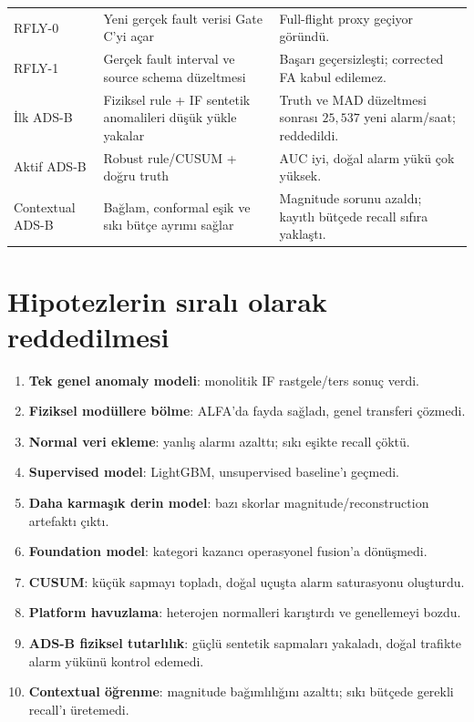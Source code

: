 \documentclass[11pt,a4paper,oneside]{report}
\begin{document}
\begin{longtable}{L{0.12\textwidth}L{0.31\textwidth}L{0.47\textwidth}}
RFLY-0 & Yeni gerçek fault verisi Gate C'yi açar & Full-flight proxy geçiyor göründü.\\
RFLY-1 & Gerçek fault interval ve source schema düzeltmesi & Başarı geçersizleşti; corrected FA kabul edilemez.\\
İlk ADS-B & Fiziksel rule + IF sentetik anomalileri düşük yükle yakalar & Truth ve MAD düzeltmesi sonrası \(25{,}537\) yeni alarm/saat; reddedildi.\\
Aktif ADS-B & Robust rule/CUSUM + doğru truth & AUC iyi, doğal alarm yükü çok yüksek.\\
Contextual ADS-B & Bağlam, conformal eşik ve sıkı bütçe ayrımı sağlar & Magnitude sorunu azaldı; kayıtlı bütçede recall sıfıra yaklaştı.\\
\bottomrule
\end{longtable}

\section{Hipotezlerin sıralı olarak reddedilmesi}

\begin{enumerate}
  \item \textbf{Tek genel anomaly modeli}: monolitik IF rastgele/ters sonuç verdi.
  \item \textbf{Fiziksel modüllere bölme}: ALFA'da fayda sağladı, genel transferi çözmedi.
  \item \textbf{Normal veri ekleme}: yanlış alarmı azalttı; sıkı eşikte recall çöktü.
  \item \textbf{Supervised model}: LightGBM, unsupervised baseline'ı geçmedi.
  \item \textbf{Daha karmaşık derin model}: bazı skorlar magnitude/reconstruction artefaktı çıktı.
  \item \textbf{Foundation model}: kategori kazancı operasyonel fusion'a dönüşmedi.
  \item \textbf{CUSUM}: küçük sapmayı topladı, doğal uçuşta alarm saturasyonu oluşturdu.
  \item \textbf{Platform havuzlama}: heterojen normalleri karıştırdı ve genellemeyi bozdu.
  \item \textbf{ADS-B fiziksel tutarlılık}: güçlü sentetik sapmaları yakaladı,
  doğal trafikte alarm yükünü kontrol edemedi.
  \item \textbf{Contextual öğrenme}: magnitude bağımlılığını azalttı; sıkı bütçede
  gerekli recall'ı üretemedi.
\end{enumerate}
\end{document}
